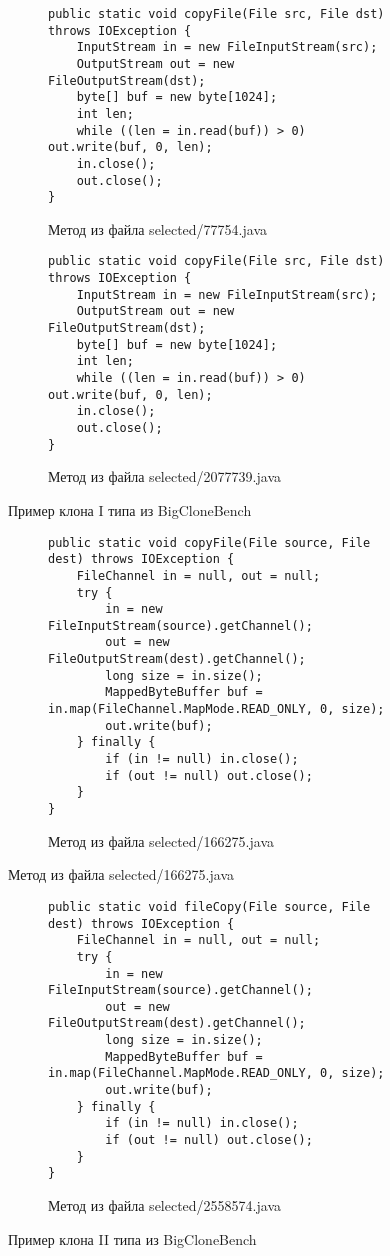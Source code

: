 \begin{figure}[H]
\begin{subfigure}{\textwidth}
\begin{lstlisting}[style=java]
public static void copyFile(File src, File dst) throws IOException {
    InputStream in = new FileInputStream(src);
    OutputStream out = new FileOutputStream(dst);
    byte[] buf = new byte[1024];
    int len;
    while ((len = in.read(buf)) > 0) out.write(buf, 0, len);
    in.close();
    out.close();
}
\end{lstlisting}
\caption{Метод из файла selected/77754.java}
\end{subfigure}
\begin{subfigure}{\textwidth}
\begin{lstlisting}[style=java]
public static void copyFile(File src, File dst) throws IOException {
    InputStream in = new FileInputStream(src);
    OutputStream out = new FileOutputStream(dst);
    byte[] buf = new byte[1024];
    int len;
    while ((len = in.read(buf)) > 0) out.write(buf, 0, len);
    in.close();
    out.close();
}
\end{lstlisting}
\caption{Метод из файла selected/2077739.java}
\end{subfigure}
\caption{Пример клона I типа из BigCloneBench}
\label{fig:first}
\end{figure}

\begin{figure}[H]
\begin{subfigure}{\textwidth}
\begin{lstlisting}[style=java]
public static void copyFile(File source, File dest) throws IOException {
    FileChannel in = null, out = null;
    try {
        in = new FileInputStream(source).getChannel();
        out = new FileOutputStream(dest).getChannel();
        long size = in.size();
        MappedByteBuffer buf = in.map(FileChannel.MapMode.READ_ONLY, 0, size);
        out.write(buf);
    } finally {
        if (in != null) in.close();
        if (out != null) out.close();
    }
}
\end{lstlisting}
\caption{Метод из файла selected/166275.java}
\end{subfigure}
\end{figure}
\begin{figure}[H]\ContinuedFloat
\begin{subfigure}{\textwidth}
\begin{lstlisting}[style=java]
public static void fileCopy(File source, File dest) throws IOException {
    FileChannel in = null, out = null;
    try {
        in = new FileInputStream(source).getChannel();
        out = new FileOutputStream(dest).getChannel();
        long size = in.size();
        MappedByteBuffer buf = in.map(FileChannel.MapMode.READ_ONLY, 0, size);
        out.write(buf);
    } finally {
        if (in != null) in.close();
        if (out != null) out.close();
    }
}
\end{lstlisting}
\caption{Метод из файла selected/2558574.java}
\end{subfigure}
\caption{Пример клона II типа из BigCloneBench}
\label{fig:second}
\end{figure}

